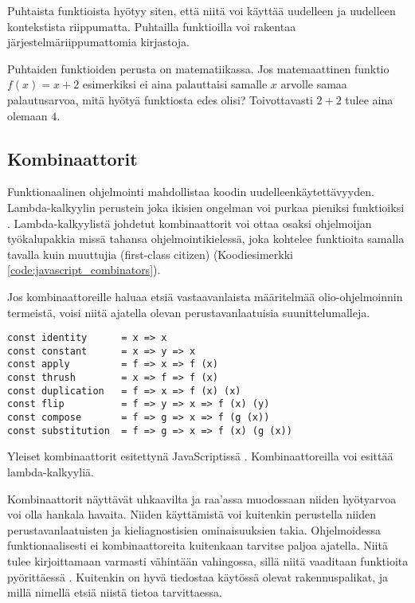 Puhtaista funktioista hyötyy siten, että niitä voi käyttää uudelleen ja uudelleen kontekstista riippumatta. Puhtailla funktioilla voi rakentaa järjestelmäriippumattomia kirjastoja.

Puhtaiden funktioiden perusta on matematiikassa. Jos matemaattinen funktio $f(x) = x+2$ esimerkiksi ei aina palauttaisi samalle $x$ arvolle samaa palautusarvoa, mitä hyötyä funktiosta edes olisi? Toivottavasti $2 + 2$ tulee aina olemaan $4$.

\subsection{Kombinaattorit}

Funktionaalinen ohjelmointi mahdollistaa koodin uudelleenkäytettävyyden. Lambda-kalkyylin perustein joka ikisien ongelman voi purkaa pieniksi funktioiksi \cite{BlellochHarper2015}. Lambda-kalkyylistä johdetut kombinaattorit voi ottaa osaksi ohjelmoijan työkalupakkia missä tahansa ohjelmointikielessä, joka kohtelee funktioita samalla tavalla kuin muuttujia (first-class citizen) (Koodiesimerkki \ref{code:javascript_combinators}).

Jos kombinaattoreille haluaa etsiä vastaavanlaista määritelmää olio-ohjelmoinnin termeistä, voisi niitä ajatella olevan perustavanlaatuisia suunittelumalleja.

\begin{code}
    \begin{verbatim}
const identity      = x => x
const constant      = x => y => x
const apply         = f => x => f (x)
const thrush        = x => f => f (x)
const duplication   = f => x => f (x) (x)
const flip          = f => y => x => f (x) (y)
const compose       = f => g => x => f (g (x)) 
const substitution  = f => g => x => f (x) (g (x))
\end{verbatim}
    \caption{Yleiset kombinaattorit esitettynä JavaScriptissä \cite{javascript_combinators}. Kombinaattoreilla voi esittää lambda-kalkyyliä.}
    \label{code:javascript_combinators}
\end{code}

Kombinaattorit näyttävät uhkaavilta ja raa'assa muodossaan niiden hyötyarvoa voi olla hankala havaita. Niiden käyttämistä voi kuitenkin perustella niiden perustavanlaatuisten ja kieliagnostisien ominaisuuksien takia. Ohjelmoidessa funktionaalisesti ei kombinaattoreita kuitenkaan tarvitse paljoa ajatella. Niitä tulee kirjoittamaan varmasti vähintään vahingossa, sillä niitä vaaditaan funktioita pyörittäessä \cite{javascript_combinators}. Kuitenkin on hyvä tiedostaa käytössä olevat rakennuspalikat, ja millä nimellä etsiä niistä tietoa tarvittaessa.


